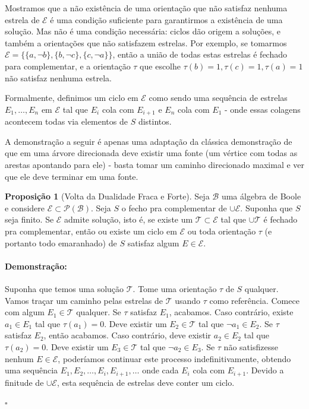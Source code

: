 \documentclass[11pt]{article}
\newcommand{\pulinho}{\vspace{.5cm}}
\theoremstyle{definition}
\theoremstyle{definition}
\theoremstyle{definition}
\newtheorem{prop}{Proposição}
\newenvironment{proposicao}{
\definecolor{shadecolor}{HTML}{FFDBDF}
\begin{shaded}
\begin{prop}
}
{
\end{prop}
\end{shaded}
}
\theoremstyle{definition}
\theoremstyle{definition}
\theoremstyle{definition}
\theoremstyle{definition}
\theoremstyle{definition}
\theoremstyle{definition}
\theoremstyle{definition}
\theoremstyle{definition}
\theoremstyle{definition}
\newenvironment{prova}{\paragraph{Demonstração:}}{\hfill$\square$ 
\pulinho
}
\theoremstyle{definition}
\theoremstyle{definition}
\begin{document}
Mostramos que a não existência de uma orientação que não satisfaz nenhuma estrela de $\mathcal{E}$ é uma condição suficiente para garantirmos a existência de uma solução. Mas não é uma condição necessária: ciclos dão origem a soluções, e também a orientações que não satisfazem estrelas. Por exemplo, se tomarmos $\mathcal{E} = \{\{a,\lnot b \}, \{b, \lnot c\}, \{c, \lnot a\}\}$, então a união de todas estas estrelas é fechado para complementar, e a orientação $\tau$ que escolhe $\tau(b) = 1, \tau (c) = 1, \tau (a) = 1$ não satisfaz nenhuma estrela.

Formalmente, definimos um ciclo em $\mathcal{E}$ como sendo uma sequência de estrelas $E_1, \dots, E_n$ em $\mathcal{E}$ tal que $E_i$ cola com $E_{i+1}$ e $E_n$ cola com $E_1$ - onde essas colagens acontecem todas via elementos de $S$ distintos.

A demonstração a seguir é apenas uma adaptação da clássica demonstração de que em uma árvore direcionada deve existir uma fonte (um vértice com todas as arestas apontando para ele) - basta tomar um caminho direcionado maximal e ver que ele deve terminar em uma fonte.

\begin{proposicao}[Volta da Dualidade Fraca e Forte]
  Seja $\mathcal{B}$ uma álgebra de Boole e considere $\mathcal{E} \subset \mathcal{P}(\mathcal{B})$. Seja $S$ o fecho pra complementar de $\cup \mathcal{E}$. Suponha que $S$ seja finito. Se $\mathcal{E}$ admite solução, isto é, se existe um $\mathcal{T} \subset \mathcal{E}$ tal que $\cup \mathcal{T}$ é fechado pra complementar, então ou existe um ciclo em $\mathcal{E}$ ou toda orientação $\tau$ (e portanto todo emaranhado) de $S$ satisfaz algum $E \in \mathcal{E}$.
\end{proposicao}
\begin{prova}
Suponha que temos uma solução $\mathcal{T}$. Tome uma orientação $\tau$ de $S$ qualquer. Vamos traçar um caminho pelas estrelas de $\mathcal{T}$ usando $\tau$ como referência. Comece com algum $E_1 \in \mathcal{T}$ qualquer. Se $\tau$ satisfaz $E_1$, acabamos. Caso contrário, existe $a_1 \in E_1$ tal que $\tau(a_1) = 0$. Deve existir um $E_2 \in \mathcal{T}$ tal que $\lnot a_1 \in E_2$. Se $\tau$ satisfaz $E_2$, então acabamos. Caso contrário, deve existir $a_2 \in E_2$ tal que $\tau(a_2) = 0$. Deve existir um $E_3 \in \mathcal{T}$ tal que $\lnot a_2 \in E_3$. Se $\tau$ não satisfizesse nenhum $E \in \mathcal{E}$, poderíamos continuar este processo indefinitivamente, obtendo uma sequência $E_1, E_2, \dots, E_i, E_{i+1}, \dots $ onde cada $E_i$ cola com $E_{i+1}$. Devido a finitude de $\cup \mathcal{E}$, esta sequência de estrelas deve conter um ciclo.

\end{prova}
\end{document}
